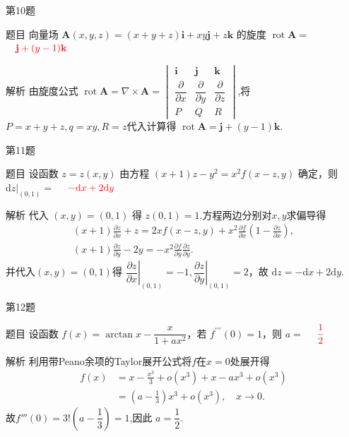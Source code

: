 \documentclass[aspectratio=169]{beamer}
\begin{document}
\begin{frame}{第10题}
\begin{block}{题目}
向量场 \(\boldsymbol{A}(x, y, z)=(x+y+z)\boldsymbol{i}+xy\boldsymbol{j}+z\boldsymbol{k}\) 的旋度 \(\operatorname{rot}\boldsymbol{A}=\) \underline{$\quad\textcolor{red}{\boldsymbol{j}+(y-1)\boldsymbol{k}}\quad$} 
\end{block}

\begin{block}{解析}
由旋度公式 $\operatorname{rot}\boldsymbol{A}=\nabla\times \boldsymbol{A}=\begin{vmatrix}\boldsymbol{i}&\boldsymbol{j}&\boldsymbol{k}\\[4pt]\dfrac{\partial}{\partial x}&\dfrac{\partial}{\partial y}&\dfrac{\partial}{\partial z}\\[4pt]P&Q&R\end{vmatrix}$,将$P=x+y+z,q=xy,R=z$代入计算得 $\operatorname{rot}\boldsymbol{A}=\boldsymbol{j}+(y-1)\boldsymbol{k}$.
\end{block}
\end{frame}

\begin{frame}{第11题}
\begin{block}{题目}
设函数 \(z=z(x, y)\) 由方程 \((x+1) z-y^{2}=x^{2} f(x-z, y)\) 确定，则 \(\left.\mathrm{d} z\right|_{(0,1)}=\) \underline{$\quad \textcolor{red}{-\mathrm{d} x+2\mathrm{d} y}\quad$} 
\end{block}

\begin{block}{解析}
代入 $(x,y)=(0,1)$ 得 $z(0,1)=1$.方程两边分别对$x,y$求偏导得
\begin{gather*}
\left( x+1 \right) \frac{\partial z}{\partial x}+z=2xf\left( x-z,y \right) +x^2\frac{\partial f}{\partial x}\left( 1-\frac{\partial z}{\partial x} \right) ,
\\
\left( x+1 \right) \frac{\partial z}{\partial y}-2y= -x^2\frac{\partial f}{\partial y}\frac{\partial z}{\partial y}.
\end{gather*}
并代入$(x,y)=(0,1)$得 $\left.\dfrac{\partial z}{\partial x}\right|_{(0,1)}=-1,\left.\dfrac{\partial z}{\partial y}\right|_{(0,1)}=2$，故 $\mathrm{d}z=-\mathrm{d}x+2\mathrm{d}y$.
\end{block}
\end{frame}

\begin{frame}{第12题}
\begin{block}{题目}
设函数 \(f(x)=\arctan x-\dfrac{x}{1+a x^{2}}\)，若 \(f^{\prime \prime \prime}(0)=1\)，则 \(a=\) \underline{$\quad \textcolor{red}{\dfrac{1}{2}}\quad$} 
\end{block}

\begin{block}{解析}
利用带Peano余项的Taylor展开公式将$f$在$x=0$处展开得
\begin{align*}
f(x)&=x-\frac{x^3}{3}+o(x^3)+x-ax^3+o(x^3)
\\
&=\left( a-\frac{1}{3} \right) x^3+o(x^3),\quad x\rightarrow 0.
\end{align*}
故$f'''(0)=3!\left(a-\dfrac{1}{3}\right)=1$,因此 $a=\dfrac{1}{2}$.
\end{block}
\end{frame}
\end{document}
